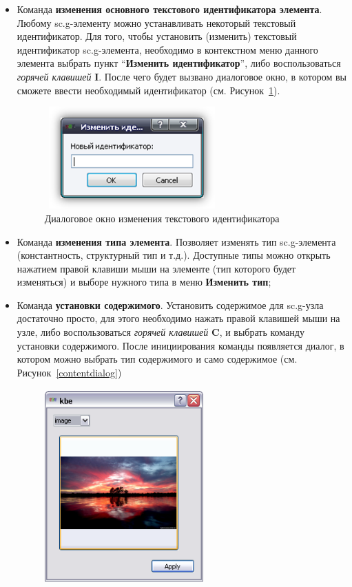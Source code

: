 \begin{itemize}
	\item Команда \textbf{изменения основного текстового идентификатора элемента}. Любому sc.g-элементу можно устанавливать некоторый текстовый идентификатор. Для того, чтобы установить (изменить) текстовый идентификатор sc.g-элемента, необходимо в контекстном меню данного элемента выбрать пункт “\textbf{Изменить идентификатор}”, либо воспользоваться \textit{горячей клавишей} \textbf{I}. После чего будет вызвано диалоговое окно, в котором вы сможете ввести необходимый идентификатор (см. Рисунок~\ref{idtfdialog}).
	\begin{figure}[h]
		\centering\includegraphics[width=6.70cm, height=3.92cm]{../images/idtfdialog.png}
		\caption{Диалоговое окно изменения текстового идентификатора}
		\label{idtfdialog}
	\end{figure}
	\item Команда \textbf{изменения типа элемента}. Позволяет изменять тип sc.g-элемента (константность, структурный тип и т.д.). Доступные типы можно открыть нажатием правой клавиши мыши на элементе (тип которого будет изменяться) и выборе нужного типа в меню \textbf{Изменить тип};
	\item Команда \textbf{установки содержимого}. Установить содержимое для sc.g-узла достаточно просто, для этого необходимо  нажать правой клавишей мыши на узле, либо воспользоваться \textit{горячей клавишей} \textbf{C}, и выбрать команду установки содержимого. После инициирования команды появляется диалог, в котором можно выбрать тип содержимого и само содержимое (см. Рисунок~\ref{contentdialog})
	\begin{figure}[h]
		\centering\includegraphics[width=6.09cm, height=7.46cm]{../images/contentdialog.png}

\end{figure}
\end{itemize}
